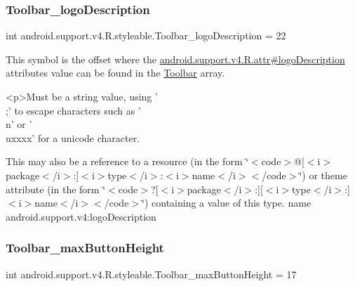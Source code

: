 \subsubsection{\texorpdfstring{Toolbar\+\_\+logo\+Description}{Toolbar\_logoDescription}}
{\footnotesize\ttfamily int android.\+support.\+v4.\+R.\+styleable.\+Toolbar\+\_\+logo\+Description = 22\hspace{0.3cm}{\ttfamily [static]}}

This symbol is the offset where the \hyperlink{classandroid_1_1support_1_1v4_1_1R_1_1attr_ae318038205e8027efc855eeed3816ce1}{android.\+support.\+v4.\+R.\+attr\#logo\+Description} attribute\textquotesingle{}s value can be found in the \hyperlink{classandroid_1_1support_1_1v4_1_1R_1_1styleable_a211358a2f951023c7735caea0fb5ae04}{Toolbar} array.

\begin{DoxyVerb}      <p>Must be a string value, using '\\;' to escape characters such as '\\n' or '\\uxxxx' for a unicode character.
\end{DoxyVerb}
 

This may also be a reference to a resource (in the form \char`\"{}$<$code$>$@\mbox{[}$<$i$>$package$<$/i$>$\+:\mbox{]}$<$i$>$type$<$/i$>$\+:$<$i$>$name$<$/i$>$$<$/code$>$\char`\"{}) or theme attribute (in the form \char`\"{}$<$code$>$?\mbox{[}$<$i$>$package$<$/i$>$\+:\mbox{]}\mbox{[}$<$i$>$type$<$/i$>$\+:\mbox{]}$<$i$>$name$<$/i$>$$<$/code$>$\char`\"{}) containing a value of this type.  name android.\+support.\+v4\+:logo\+Description \mbox{\label{classandroid_1_1support_1_1v4_1_1R_1_1styleable_a6b04787e5b1049d59002016f695019df}} 
\subsubsection{\texorpdfstring{Toolbar\+\_\+max\+Button\+Height}{Toolbar\_maxButtonHeight}}
{\footnotesize\ttfamily int android.\+support.\+v4.\+R.\+styleable.\+Toolbar\+\_\+max\+Button\+Height = 17\hspace{0.3cm}{\ttfamily [static]}}

